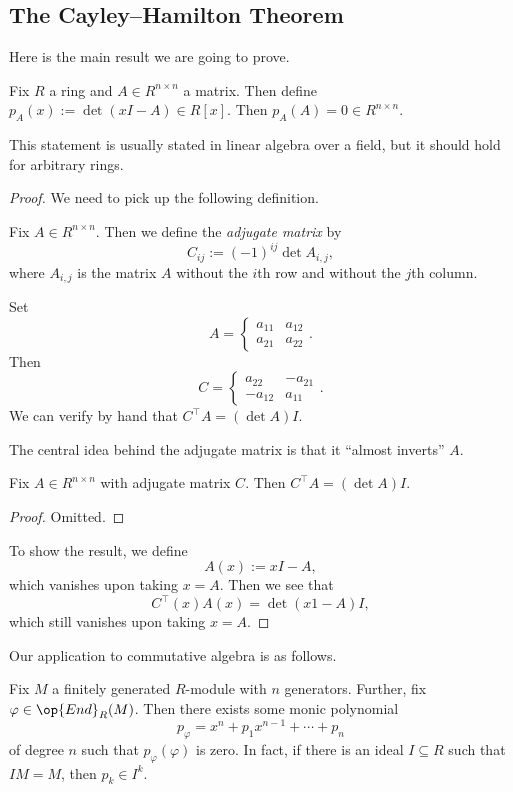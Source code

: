 \subsection{The Cayley--Hamilton Theorem}
Here is the main result we are going to prove.
\begin{theorem}
	Fix $R$ a ring and $A\in R^{n\times n}$ a matrix. Then define $p_A(x):=\det(xI-A)\in R[x]$. Then $p_A(A)=0\in R^{n\times n}$.
\end{theorem}
This statement is usually stated in linear algebra over a field, but it should hold for arbitrary rings.
\begin{proof}
	We need to pick up the following definition.
	\begin{definition}
		Fix $A\in R^{n\times n}$. Then we define the \textit{adjugate matrix} by
		\[C_{ij}:=(-1)^{ij}\det A_{i,j},\]
		where $A_{i,j}$ is the matrix $A$ without the $i$th row and without the $j$th column.
	\end{definition}
	\begin{example}
		Set
		\[A=\begin{cases}
			a_{11} & a_{12} \\
			a_{21} & a_{22}
		\end{cases}.\]
		Then
		\[C=\begin{cases}
			a_{22} & -a_{21} \\
			-a_{12} & a_{11}
		\end{cases}.\]
		We can verify by hand that $C^\intercal A=(\det A)I$.
	\end{example}
	The central idea behind the adjugate matrix is that it ``almost inverts'' $A$.
	\begin{lemma}
		Fix $A\in R^{n\times n}$ with adjugate matrix $C$. Then $C^\intercal A=(\det A)I$.
	\end{lemma}
	\begin{proof}
		Omitted.
	\end{proof}
	To show the result, we define
	\[A(x):=xI-A,\]
	which vanishes upon taking $x=A$. Then we see that
	\[C^\intercal(x)A(x)=\det(x1-A)I,\]
	which still vanishes upon taking $x=A$.
\end{proof}
Our application to commutative algebra is as follows.
\begin{theorem} \label{thm:betterch}
	Fix $M$ a finitely generated $R$-module with $n$ generators. Further, fix $\varphi\in\op{End}_R(M)$. Then there exists some monic polynomial
	\[p_\varphi=x^n+p_1x^{n-1}+\cdots+p_n\]
	of degree $n$ such that $p_\varphi(\varphi)$ is zero. In fact, if there is an ideal $I\subseteq R$ such that $IM=M$, then $p_k\in I^k$.
\end{theorem}
